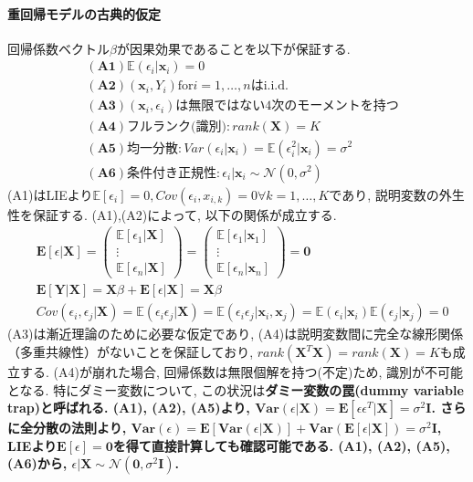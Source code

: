 \documentclass[paper=a4paper,fontsize=10pt]{jlreq}
\begin{document}
\paragraph{重回帰モデルの古典的仮定}
回帰係数ベクトル$\beta$が因果効果であることを以下が保証する. 
\begin{align*}
  &\mathbf{(A1)}　 \mathbb{E}(\epsilon_i|\mathbf{x}_{i})=0\\
  &\mathbf{(A2)}　 (\mathbf{x}_{i}, Y_{i})　\text{for}　i=1, \dots, n　\text{はi.i.d.}\\
  &\mathbf{(A3)}　 (\mathbf{x}_{i}, \epsilon_{i})\text{は無限ではない4次のモーメントを持つ}\\
  &\mathbf{(A4)}　 \text{フルランク(識別)}: rank(\mathbf{X})=K\\
  &\mathbf{(A5)}　 \text{均一分散}: Var(\epsilon_i|\mathbf{x}_{i})=\mathbb{E}(\epsilon_i^2|\mathbf{x}_{i})=\sigma^{2}\\
  &\mathbf{(A6)}　 条件付き正規性: \epsilon_i|\mathbf{x}_{i} \sim \mathcal{N} (0, \sigma^{2})
\end{align*}
(A1)はLIEより$\mathbb{E}[\epsilon_i]=0, Cov(\epsilon_i, x_{i,k})=0\forall k=1,\dots,K$であり, 説明変数の外生性を保証する. (A1),(A2)によって, 以下の関係が成立する.
\begin{align*}
  &\mathbf{E}[\epsilon | \mathbf{X}] = 
  \begin{pmatrix} 
    \mathbb{E}[\epsilon_1 |\mathbf{X}] \\ \vdots \\ \mathbb{E}[\epsilon_n |\mathbf{X}] 
  \end{pmatrix} 
  = 
  \begin{pmatrix} 
    \mathbb{E}[\epsilon_1 |\mathbf{x}_1] \\ \vdots \\ \mathbb{E}[\epsilon_n |\mathbf{x}_n] 
  \end{pmatrix} 
  = \mathbf{0}\\
  &\mathbf{E[Y|X]}=\mathbf{X}\beta + \mathbf{E}[\epsilon | \mathbf{X}] = \mathbf{X}\beta\\
  &Cov(\epsilon_i, \epsilon_j | \mathbf{X})=\mathbb{E}(\epsilon_i \epsilon_j | \mathbf{X})=\mathbb{E}(\epsilon_i \epsilon_j | \mathbf{x}_i, \mathbf{x}_j)=\mathbb{E}(\epsilon_i | \mathbf{x}_i) \mathbb{E}(\epsilon_j |\mathbf{x}_j)=0
\end{align*}
(A3)は漸近理論のために必要な仮定であり, (A4)は説明変数間に完全な線形関係（多重共線性）がないことを保証しており, $rank(\mathbf{X}^T\mathbf{X})=rank(\mathbf{X})=K$も成立する. (A4)が崩れた場合, 回帰係数は無限個解を持つ(不定)ため, 識別が不可能となる. 特にダミー変数について, この状況は\rmfamily\mcfamily\bfseries{ダミー変数の罠(dummy variable trap)}\mdseries と呼ばれる. (A1), (A2), (A5)より, $\mathbf{Var}(\epsilon | \mathbf{X})=\mathbf{E}[\epsilon\epsilon^T| \mathbf{X}]=\sigma^2\mathbf{I}$. さらに全分散の法則より, $\mathbf{Var}(\epsilon)=\mathbf{E}[\mathbf{Var}(\epsilon | \mathbf{X})]+\mathbf{Var}(\mathbf{E}[\epsilon | \mathbf{X}])=\sigma^2\mathbf{I}$, LIEより$\mathbf{E}[\epsilon]=\mathbf{0}$を得て直接計算しても確認可能である. (A1), (A2), (A5), (A6)から, $\epsilon|\mathbf{X} \sim \mathcal{N} (\mathbf{0}, \sigma^{2}\mathbf{I})$.\\
\end{document}
